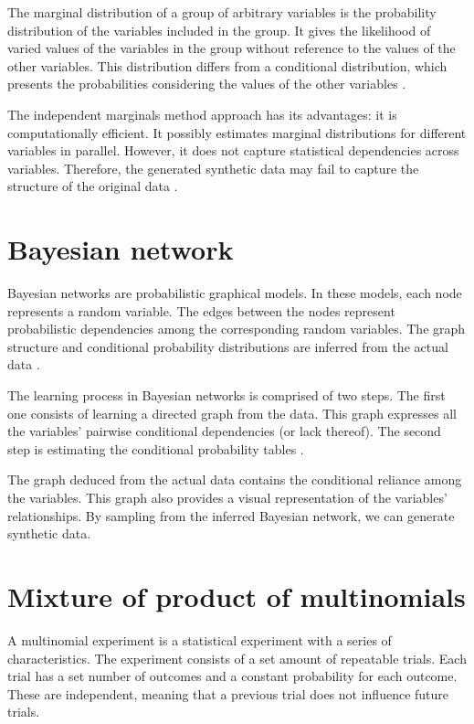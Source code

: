 The marginal distribution of a group of arbitrary variables is the probability distribution of the variables included in the group. It gives the likelihood of varied values of the variables in the group without reference to the values of the other variables. This distribution differs from a conditional distribution, which presents the probabilities considering the values of the other variables \citep{trumpler1953statistical}.

The independent marginals method approach has its advantages: it is computationally efficient. It possibly estimates marginal distributions for different variables in parallel. However, it does not capture statistical dependencies across variables. Therefore, the generated synthetic data may fail to capture the structure of the original data \citep{disclosure}.

\section{Bayesian network}
Bayesian networks are probabilistic graphical models. In these models, each node represents a random variable. The edges between the nodes represent probabilistic dependencies among the corresponding random variables. The graph structure and conditional probability distributions are inferred from the actual data \citep{baye}.

The learning process in Bayesian networks is comprised of two steps. The first one consists of learning a directed graph from the data. This graph expresses all the variables’ pairwise conditional dependencies (or lack thereof). The second step is estimating the conditional probability tables \citep{disclosure}.

The graph deduced from the actual data contains the conditional reliance among the variables. This graph also provides a visual representation of the variables’ relationships. By sampling from the inferred Bayesian network, we can generate synthetic data.

\section{Mixture of product of multinomials} %
A multinomial experiment is a statistical experiment with a series of characteristics. The experiment consists of a set amount of repeatable trials. Each trial has a set number of outcomes and a constant probability for each outcome. These are independent, meaning that a previous trial does not influence future trials.


